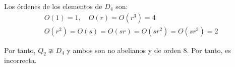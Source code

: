 \documentclass[12pt]{article}
\begin{document}
\begin{ejercicio}
\begin{enumerate}
\begin{enumerate}
                Los órdenes de los elementos de $D_4$ son:
                \begin{gather*}
                    O(1)=1,\quad O(r)=O(r^3)=4\\
                    O(r^2)=O(s)=O(sr)=O(sr^2)=O(sr^3)=2
                \end{gather*}

                Por tanto, $Q_2\ncong D_4$ y ambos son no abelianos y de orden 8. Por tanto, es incorrecta.
                
                \begin{comment}
                Veámoslo. Sea $G$ no abeliano, con $|G|=8$, sabemos que todo elemento de $G$ tiene orden 1, 2, 4 u 8. Caben las siguientes posibilidades:
                \begin{itemize}
                    \item \ul{$\exists x\in G$ con $O(x)=8$}.
                    
                    En este caso, $\langle x\rangle = G$ y $G$ es cíclico y por tanto abeliano, lo que contradice la hipótesis.

                    \item \ul{$\nexists x\in G$ con $O(x)=8$}.
                    
                    Entonces, aparte del $1$, todo elemento de $G$ cumplirá $O(x)\in \{2,4\}$.
                    \begin{itemize}
                        \item \ul{$\nexists x\in G$ con $O(x)=4$}.
                        
                        En este caso, todos los elementos de $G$ tendrán orden 2. Sea $x\in G$ con $O(x)=2$, entonces $\langle x\rangle = \{1,x\}$. Como $|G|=8$, elegimos $y\in G\setminus \langle x\rangle$ y $O(y)=2$. Comprobemos que $xy\notin \{1,x,y\}$:
                        \begin{itemize}
                            \item $xy=1\Rightarrow y=x$, contradicción.
                            \item $xy=x\Rightarrow y=1$, contradicción.
                            \item $xy=y\Rightarrow x=1$, contradicción.
                        \end{itemize}


\end{comment}
\end{enumerate}
\end{enumerate}
\end{ejercicio}
\end{document}
